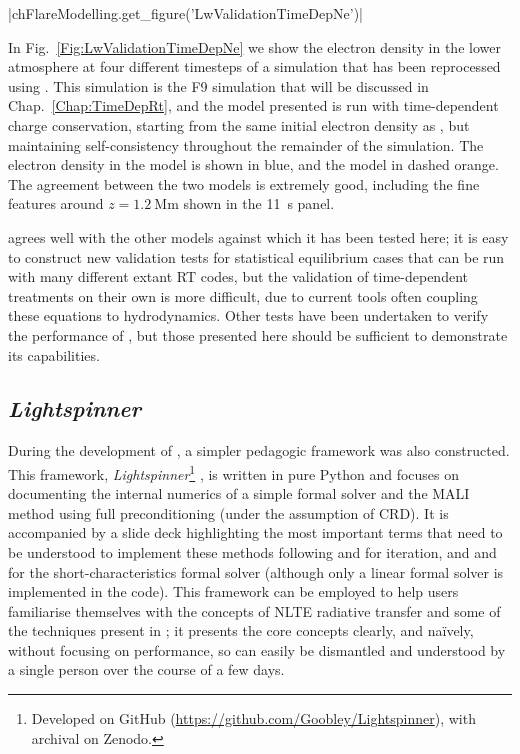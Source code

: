 \py[FlareModelling]|chFlareModelling.get_figure('LwValidationTimeDepNe')|

In Fig.~\ref{Fig:LwValidationTimeDepNe} we show the electron density in the lower atmosphere at four different timesteps of a \Radyn{} simulation that has been reprocessed using \Lw{}.
This simulation is the F9 simulation that will be discussed in Chap.~\ref{Chap:TimeDepRt}, and the \Lw{} model presented is run with time-dependent charge conservation, starting from the same initial electron density as \Radyn{}, but maintaining self-consistency throughout the remainder of the simulation.
The electron density in the \Radyn{} model is shown in blue, and the \Lw{} model in dashed orange.
The agreement between the two models is extremely good, including the fine features around $z=\SI{1.2}{\mega\metre}$ shown in the \SI{11}{\second} panel.

\Lw{} agrees well with the other models against which it has been tested here; it is easy to construct new validation tests for statistical equilibrium cases that can be run with many different extant RT codes, but the validation of time-dependent treatments on their own is more difficult, due to current tools often coupling these equations to hydrodynamics.
Other tests have been undertaken to verify the performance of \Lw{}, but those presented here should be sufficient to demonstrate its capabilities.


\subsection{\emph{Lightspinner}}

During the development of \Lw{}, a simpler pedagogic framework was also constructed.
This framework, \emph{Lightspinner}\footnote{Developed on GitHub (\url{https://github.com/Goobley/Lightspinner}), with archival on Zenodo.} \citep{Lightspinner}, is written in pure Python and focuses on documenting the internal numerics of a simple formal solver and the MALI method using full preconditioning (under the assumption of CRD).
It is accompanied by a slide deck highlighting the most important terms that need to be understood to implement these methods following \citet{Rybicki1992} and \citet{Uitenbroek2001} for iteration, and \citet{Olson1987} and \citet{Auer1994} for the short-characteristics formal solver (although only a linear formal solver is implemented in the code). This framework can be employed to help users familiarise themselves with the concepts of NLTE radiative transfer and some of the techniques present in \Lw{}; it presents the core concepts clearly, and naïvely, without focusing on performance, so can easily be dismantled and understood by a single person over the course of a few days.

